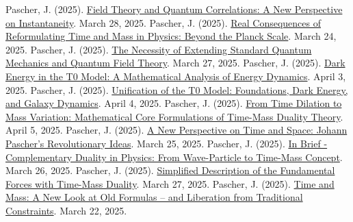 \documentclass[12pt,a4paper]{article}
\begin{document}
\begin{thebibliography}{99}
			 Pascher, J. (2025). \href{https://github.com/jpascher/T0-Time-Mass-Duality/tree/main/2/pdf/English/FeldtheorieQuantenEn.pdf}{Field Theory and Quantum Correlations: A New Perspective on Instantaneity}. March 28, 2025.
			 Pascher, J. (2025). \href{https://github.com/jpascher/T0-Time-Mass-Duality/tree/main/2/pdf/English/JenseitsPlanckEn.pdf}{Real Consequences of Reformulating Time and Mass in Physics: Beyond the Planck Scale}. March 24, 2025.
			 Pascher, J. (2025). \href{https://github.com/jpascher/T0-Time-Mass-Duality/tree/main/2/pdf/English/NotwendigkeitQMErweiterungEn.pdf}{The Necessity of Extending Standard Quantum Mechanics and Quantum Field Theory}. March 27, 2025.
			 Pascher, J. (2025). \href{https://github.com/jpascher/T0-Time-Mass-Duality/tree/main/2/pdf/English/MathEnergiedynamikEn.pdf}{Dark Energy in the T0 Model: A Mathematical Analysis of Energy Dynamics}. April 3, 2025.
			 Pascher, J. (2025). \href{https://github.com/jpascher/T0-Time-Mass-Duality/tree/main/2/pdf/English/T0VereinheitlichungDEGalEn.pdf}{Unification of the T0 Model: Foundations, Dark Energy, and Galaxy Dynamics}. April 4, 2025.
			 Pascher, J. (2025). \href{https://github.com/jpascher/T0-Time-Mass-Duality/tree/main/2/pdf/English/MathZeitMasseLagrangeEn.pdf}{From Time Dilation to Mass Variation: Mathematical Core Formulations of Time-Mass Duality Theory}. April 5, 2025.
			 Pascher, J. (2025). \href{https://github.com/jpascher/T0-Time-Mass-Duality/tree/main/2/pdf/English/ZeitRaumPascherEn.pdf}{A New Perspective on Time and Space: Johann Pascher's Revolutionary Ideas}. March 25, 2025.
			 Pascher, J. (2025). \href{https://github.com/jpascher/T0-Time-Mass-Duality/tree/main/2/pdf/English/KurzKomplementDualPhysikEn.pdf}{In Brief - Complementary Duality in Physics: From Wave-Particle to Time-Mass Concept}. March 26, 2025.
			 Pascher, J. (2025). \href{https://github.com/jpascher/T0-Time-Mass-Duality/tree/main/2/pdf/English/VierKraefteZeitMasseEn.pdf}{Simplified Description of the Fundamental Forces with Time-Mass Duality}. March 27, 2025.
			 Pascher, J. (2025). \href{https://github.com/jpascher/T0-Time-Mass-Duality/tree/main/2/pdf/English/ZeitMasseNeuerBlickEn.pdf}{Time and Mass: A New Look at Old Formulas – and Liberation from Traditional Constraints}. March 22, 2025.

\end{thebibliography}
\end{document}
